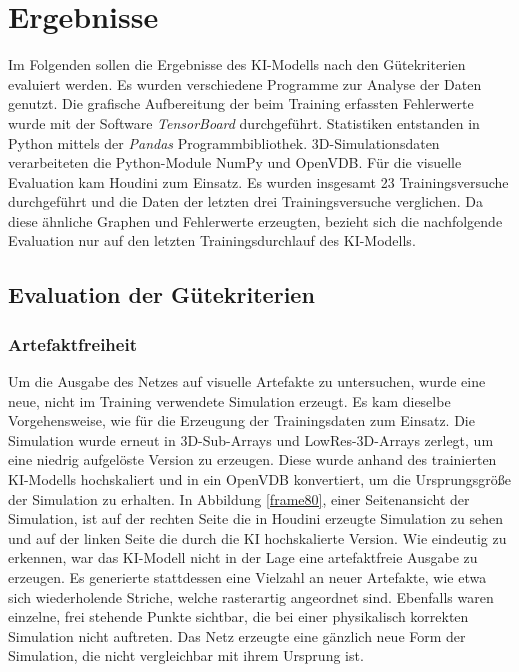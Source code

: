 \chapter{Ergebnisse}
\thispagestyle{fancy}

Im Folgenden sollen die Ergebnisse des KI-Modells nach den Gütekriterien evaluiert werden. Es wurden verschiedene Programme zur Analyse der Daten genutzt. Die grafische Aufbereitung der beim Training erfassten Fehlerwerte wurde mit der Software \textit{TensorBoard} \parencite{TensorBoard} durchgeführt. Statistiken entstanden in Python mittels der \textit{Pandas} \parencite{reback2020pandas} Programmbibliothek. 3D-Simulationsdaten verarbeiteten die Python-Module NumPy und OpenVDB. Für die visuelle Evaluation kam Houdini zum Einsatz. Es wurden insgesamt 23 Trainingsversuche durchgeführt und die Daten der letzten drei Trainingsversuche verglichen. Da diese ähnliche Graphen und Fehlerwerte erzeugten, bezieht sich die nachfolgende Evaluation nur auf den letzten Trainingsdurchlauf des KI-Modells.

\section{Evaluation der Gütekriterien}

\subsection{Artefaktfreiheit} Um die Ausgabe des Netzes auf visuelle Artefakte zu untersuchen, wurde eine neue, nicht im Training verwendete Simulation erzeugt. Es kam  dieselbe Vorgehensweise, wie für die Erzeugung der Trainingsdaten zum Einsatz. Die Simulation wurde erneut in 3D-Sub-Arrays und LowRes-3D-Arrays zerlegt, um eine niedrig aufgelöste Version zu erzeugen. Diese wurde anhand des trainierten KI-Modells hochskaliert und in ein OpenVDB konvertiert, um die Ursprungsgröße der Simulation zu erhalten. In Abbildung \ref{frame80}, einer Seitenansicht der Simulation, ist auf der rechten Seite die in Houdini erzeugte Simulation zu sehen und auf der linken Seite die durch die KI hochskalierte Version. Wie eindeutig zu erkennen, war das KI-Modell nicht in der Lage eine artefaktfreie Ausgabe zu erzeugen. Es generierte stattdessen eine Vielzahl an neuer Artefakte, wie etwa sich wiederholende Striche, welche rasterartig angeordnet sind. Ebenfalls waren einzelne, frei stehende Punkte sichtbar, die bei einer physikalisch korrekten Simulation nicht auftreten. Das Netz erzeugte eine gänzlich neue Form der Simulation, die nicht vergleichbar mit ihrem Ursprung ist.\\

